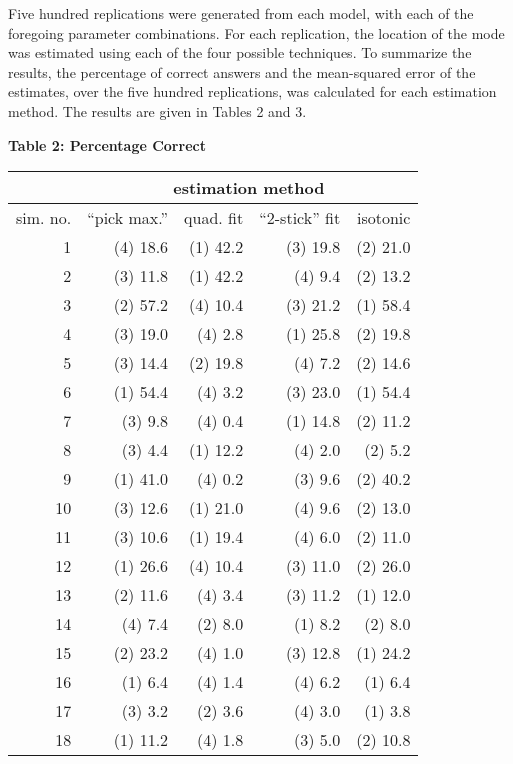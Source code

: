 Five hundred replications were generated from each model,
with each of the foregoing parameter combinations.  For
each replication, the location of the mode was estimated
using each of the four possible techniques.  To summarize
the results, the percentage of correct answers and the
mean-squared error of the estimates, over the five hundred
replications, was calculated for each estimation method.
The results are given in Tables 2 and 3.

\begin{table}[htb]
\begin{centre} 

{\bf Table 2:  Percentage Correct}\\[0.5cm]

\begin{tabular} {| r | r | r | r | r |} \hline
         & \multicolumn{4}{c|}{ estimation method } \\ \hline
sim. no. & ``pick max.'' & quad. fit & ``2-stick'' fit & isotonic \\ \hline
1 & (4) 18.6   & (1) 42.2   & (3) 19.8   & (2) 21.0   \\ \hline
2 & (3) 11.8   & (1) 42.2   & (4) 9.4   & (2) 13.2   \\ \hline
3 & (2) 57.2   & (4) 10.4   & (3) 21.2   & (1) 58.4   \\ \hline
4 & (3) 19.0   & (4) 2.8   & (1) 25.8   & (2) 19.8   \\ \hline
5 & (3) 14.4   & (2) 19.8   &  (4) 7.2   & (2) 14.6   \\ \hline
6 & (1) 54.4   &  (4) 3.2   & (3) 23.0   & (1) 54.4   \\ \hline
7 &  (3) 9.8   &  (4) 0.4   & (1) 14.8   & (2) 11.2   \\ \hline
8 &  (3) 4.4   & (1) 12.2   &  (4) 2.0   &  (2) 5.2   \\ \hline
9 & (1) 41.0   &  (4) 0.2   &  (3) 9.6   & (2) 40.2   \\ \hline
10 & (3) 12.6   & (1) 21.0   &  (4) 9.6   & (2) 13.0   \\ \hline
11 & (3) 10.6   & (1) 19.4   &  (4) 6.0   & (2) 11.0   \\ \hline
12 & (1) 26.6   & (4) 10.4   & (3) 11.0   & (2) 26.0   \\ \hline
13 & (2) 11.6   &  (4) 3.4   & (3) 11.2   & (1) 12.0   \\ \hline
14 &  (4) 7.4   &  (2) 8.0   &  (1) 8.2   &  (2) 8.0   \\ \hline
15 & (2) 23.2   &  (4) 1.0   & (3) 12.8   & (1) 24.2   \\ \hline
16 &  (1) 6.4   &  (4) 1.4   &  (4) 6.2   &  (1) 6.4   \\ \hline
17 &  (3) 3.2   &  (2) 3.6   &  (4) 3.0   &  (1) 3.8   \\ \hline
18 & (1) 11.2   &  (4) 1.8   &  (3) 5.0   & (2) 10.8   \\ \hline
\end{tabular} 
\end{centre}


\end{table}
